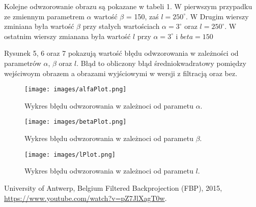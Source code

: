 \documentclass{article}
\begin{document}
Kolejne odwzorowanie obrazu są pokazane w tabeli 1. W pierwszym przypadku ze zmiennym parametrem $\alpha$ wartość $\beta$ = 150, zaś $ l = 250^{\circ}$. W Drugim wierszy zminiana była wartość $\beta$ przy stałych wartościach $\alpha = 3^{\circ}$ oraz $ l = 250^{\circ}$. W ostatnim wierszy zmianana była wartość $l$ przy $\alpha = 3^{\circ}$ i $beta = 150$

Rysunek 5, 6 oraz 7 pokazują wartość błędu odwzorowania w zależności od parametrów $\alpha$, $\beta$ oraz $l$. Błąd to obliczony błąd średniokwadratowy pomiędzy wejściwoym obrazem a obrazami wyjściowymi w wersji z filtracją oraz bez.
\begin{figure}
\centering
\texttt{[image: images/alfaPlot.png]} 
\caption{Wykres błędu odwzorowania w zależnoci od parametu $\alpha$.}
\end{figure}
\begin{figure}
\texttt{[image: images/betaPlot.png]}
\caption{Wykres błędu odwzorowania w zależnoci od parametu $\beta$.}
\end{figure}
\begin{figure}
\texttt{[image: images/lPlot.png]}
\caption{Wykres błędu odwzorowania w zależnoci od parametu $l$.}
\end{figure}

\begin{thebibliography}{9}

 \hypertarget{ramlak}{} University of Antwerp, Belgium Filtered Backprojection (FBP), 2015, \url{https://www.youtube.com/watch?v=pZ7JlXagT0w}.

\end{thebibliography}
\end{document}
